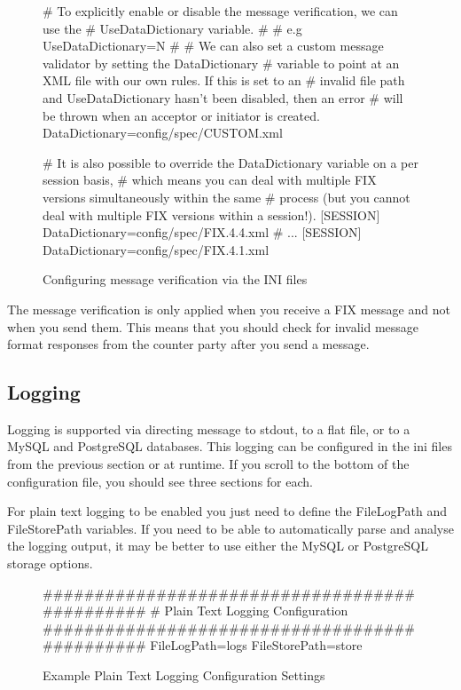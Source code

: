 \begin{figure}[H]
\begin{inicode}
[DEFAULT]
# To explicitly enable or disable the message verification, we can use the
# UseDataDictionary variable.
#
# e.g UseDataDictionary=N
#
# We can also set a custom message validator by setting the DataDictionary
# variable to point at an XML file with our own rules. If this is set to an
# invalid file path and UseDataDictionary hasn't been disabled, then an error
# will be thrown when an acceptor or initiator is created.
DataDictionary=config/spec/CUSTOM.xml

# It is also possible to override the DataDictionary variable on a per session basis,
# which means you can deal with multiple FIX versions simultaneously within the same
# process (but you cannot deal with multiple FIX versions within a session!).
[SESSION]
DataDictionary=config/spec/FIX.4.4.xml
# ...
[SESSION]
DataDictionary=config/spec/FIX.4.1.xml

\end{inicode}
\caption{Configuring message verification via the INI files}
\end{figure}

The message verification is only applied when you receive a FIX message and not when
you send them. This means that you should check for invalid message format responses
from the counter party after you send a message.

\subsection{Logging}
Logging is supported via directing message to stdout, to a flat file, or to a MySQL and PostgreSQL databases. This logging can be configured in the ini files from the previous section or at runtime. If you scroll to the bottom of the configuration file, you should see three sections for each.

For plain text logging to be enabled you just need to define the FileLogPath and FileStorePath variables. If you need to be able to automatically parse and analyse the logging output, it may
be better to use either the MySQL or PostgreSQL storage options.

\begin{figure}[H]
\begin{inicode}
	##############################################
	#       Plain Text Logging Configuration 
	##############################################
	FileLogPath=logs
	FileStorePath=store
\end{inicode}
\caption{Example Plain Text Logging Configuration Settings}
\end{figure}

